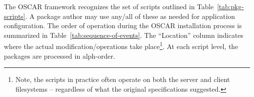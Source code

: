 The OSCAR framework recognizes the set of scripts outlined in
Table~\ref{tab:pkg-scripts}.  A package author may use any/all of these as
needed for application configuration.  The order of operation during the
OSCAR installation process is summarized in
Table~\ref{tab:sequence-of-events}.  The ``Location'' column indicates
where the actual modification/operations take place\footnote{Note, the
 scripts in practice often operate on both the server
and client filesystems -- regardless of what the original specifications
suggested.}.  At each script level, the packages are processed in
alph-order.



